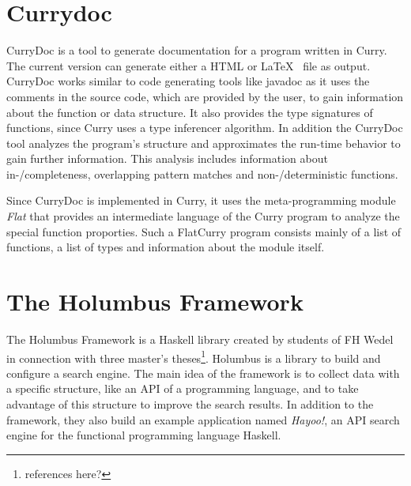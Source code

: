 \documentclass[%
	pdftex,%
	a4paper,%
	oneside,%
	chapterprefix,%
	headsepline,%
	12pt%
]{scrbook}
\begin{document}
\section{Currydoc}\label{preliminaries:currydoc}

CurryDoc is a tool to generate documentation for a program written in
Curry. The current version can generate either a HTML or \LaTeX~ file
as output. CurryDoc works similar to code generating tools like
javadoc\cite{javadoc} as it uses the comments in the source code, which
are provided by the user, to gain information about the function or
data structure. It also provides the type signatures of functions,
since Curry uses a type inferencer algorithm. In addition the CurryDoc tool
analyzes the program's structure and approximates the run-time
behavior to gain further information\cite{currydoc2}. This analysis includes information about
in-/completeness, overlapping pattern matches and non-/deterministic
functions.

Since CurryDoc is implemented in Curry, it uses the meta-programming
module \emph{Flat}\cite{flat2} that provides an intermediate language of the Curry
program to analyze the special function proporties. Such a
FlatCurry\cite{flat} program consists mainly of a list of functions, a
list of types and information about the module itself.


\section{The Holumbus Framework}\label{preliminaries:holumbus}
The Holumbus Framework is a Haskell library created by students of FH
Wedel in connection with three master's theses\footnote{references
  here?}. Holumbus is a library to build and configure a search engine. The
main idea of the framework is to collect data with a specific
structure, like an API of a programming language, and to take
advantage of this structure to improve the search results. In addition
to the framework, they also build an example application named
\emph{Hayoo!}\cite{hayoo}, an API search engine for the functional
programming language Haskell.\\
\end{document}
